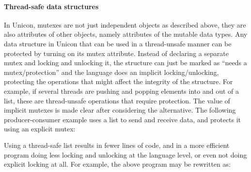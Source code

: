 \paragraph{Thread-safe data structures}

In Unicon, mutexes are not just independent objects as described above, they are
also attributes of other objects, namely attributes of the mutable data
types. Any data structure in Unicon that can be used in a thread-unsafe manner
can be protected by turning on its mutex attribute. Instead of declaring a
separate mutex and locking and unlocking it, the structure can just be marked as
``needs a mutex/protection'' and the language does an implicit
locking/unlocking, protecting the operations that might affect the integrity of
the structure.  For example, if several threads are pushing and popping elements
into and out of a list, these are thread-unsafe operations that require
protection.  The value of implicit mutexes is made clear after considering the
alternative. The following producer-consumer example uses a list to send and
receive data, and protects it using an explicit mutex:


Using a thread-safe list results in fewer lines of code, and in a more efficient
program doing less locking and unlocking at the language level, or even not
doing explicit locking at all. For example, the above program may be rewritten
as:


